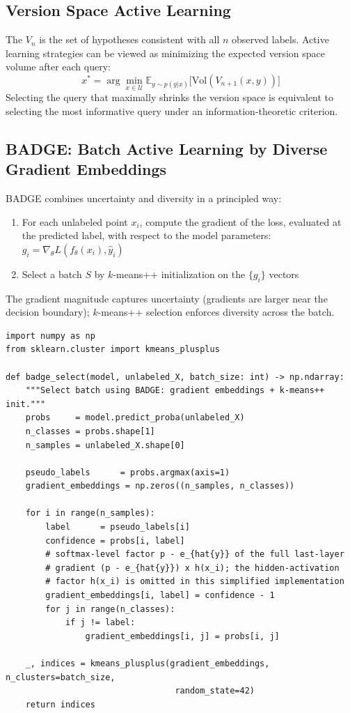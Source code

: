 \subsection{Version Space Active Learning}

The  $V_n$ is the set of hypotheses consistent with all $n$ observed labels. Active learning strategies can be viewed as minimizing the expected version space volume after each query:
\[
x^* = \arg\min_{x \in \mathcal{U}} \mathbb{E}_{y \sim p(y|x)}\bigl[\mathrm{Vol}(V_{n+1}(x, y))\bigr]
\]
Selecting the query that maximally shrinks the version space is equivalent to selecting the most informative query under an information-theoretic criterion.

\subsection{BADGE: Batch Active Learning by Diverse Gradient Embeddings}

BADGE \autocite{ash2020badge} combines uncertainty and diversity in a principled way:
\begin{enumerate}
    \item For each unlabeled point $x_i$, compute the gradient of the loss, evaluated at the predicted label, with respect to the model parameters: $g_i = \nabla_\theta L(f_\theta(x_i), \hat{y}_i)$
    \item Select a batch $S$ by $k$-means++ initialization on the $\{g_i\}$ vectors
\end{enumerate}
The gradient magnitude captures uncertainty (gradients are larger near the decision boundary); $k$-means++ selection enforces diversity across the batch.

\begin{lstlisting}[style=python, caption={BADGE selection via gradient embeddings and k-means++}]
import numpy as np
from sklearn.cluster import kmeans_plusplus

def badge_select(model, unlabeled_X, batch_size: int) -> np.ndarray:
    """Select batch using BADGE: gradient embeddings + k-means++ init."""
    probs     = model.predict_proba(unlabeled_X)
    n_classes = probs.shape[1]
    n_samples = unlabeled_X.shape[0]

    pseudo_labels      = probs.argmax(axis=1)
    gradient_embeddings = np.zeros((n_samples, n_classes))

    for i in range(n_samples):
        label      = pseudo_labels[i]
        confidence = probs[i, label]
        # softmax-level factor p - e_{hat{y}} of the full last-layer
        # gradient (p - e_{hat{y}}) x h(x_i); the hidden-activation
        # factor h(x_i) is omitted in this simplified implementation
        gradient_embeddings[i, label] = confidence - 1
        for j in range(n_classes):
            if j != label:
                gradient_embeddings[i, j] = probs[i, j]

    _, indices = kmeans_plusplus(gradient_embeddings, n_clusters=batch_size,
                                  random_state=42)
    return indices
\end{lstlisting}

